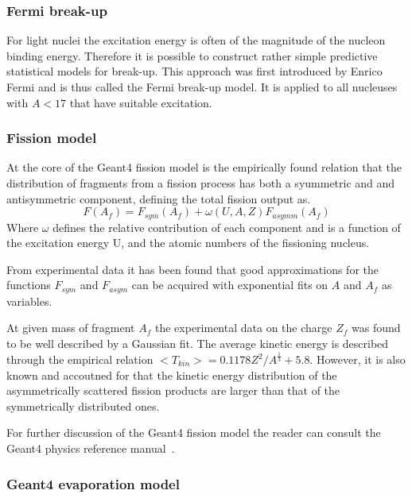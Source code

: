 \subsubsection{Fermi break-up}

For light nuclei the excitation energy is often of the magnitude of the nucleon binding energy. Therefore it is possible to construct rather simple predictive statistical models for break-up. This approach was first introduced by Enrico Fermi and is thus called the Fermi break-up model. It is applied to all nucleuses with $A < 17$ that have suitable excitation. %

\subsubsection{Fission model}

At the core of the Geant4 fission model is the empirically found relation that the distribution of fragments from a fission process has both a syummetric and and antisymmetric component, defining the total fission output as.
\begin{equation}
 F(A_f) = F_{sym}(A_f) + \omega(U,A,Z) F_{asymm}(A_f) 
\label{fissionSymmetricAsymmetric}
\end{equation}
Where $\omega$ defines the relative contribution of each component and is a function of the excitation energy U, and the atomic numbers of the fissioning nucleus.

From experimental data it has been found that good approximations for the functions $F_{sym}$ and $F_{asym}$ can be acquired with exponential fits on $A$ and $A_f$ as variables.

At given mass of fragment $A_f$ the experimental data on the charge $Z_f$ was found to be well described by a Gaussian fit. The average kinetic energy is described through the empirical relation $<T_{kin}>=0.1178Z^2/A^\frac{1}{3} + 5.8$. However, it is also known and accoutned for that the kinetic energy distribution of the asymmetrically scattered fission products are larger than that of the symmetrically distributed ones. 

For further discussion of the Geant4 fission model the reader can consult the Geant4 physics reference manual~\cite[Chap 31.]{physicsManual}.

\subsubsection{Geant4 evaporation model}

